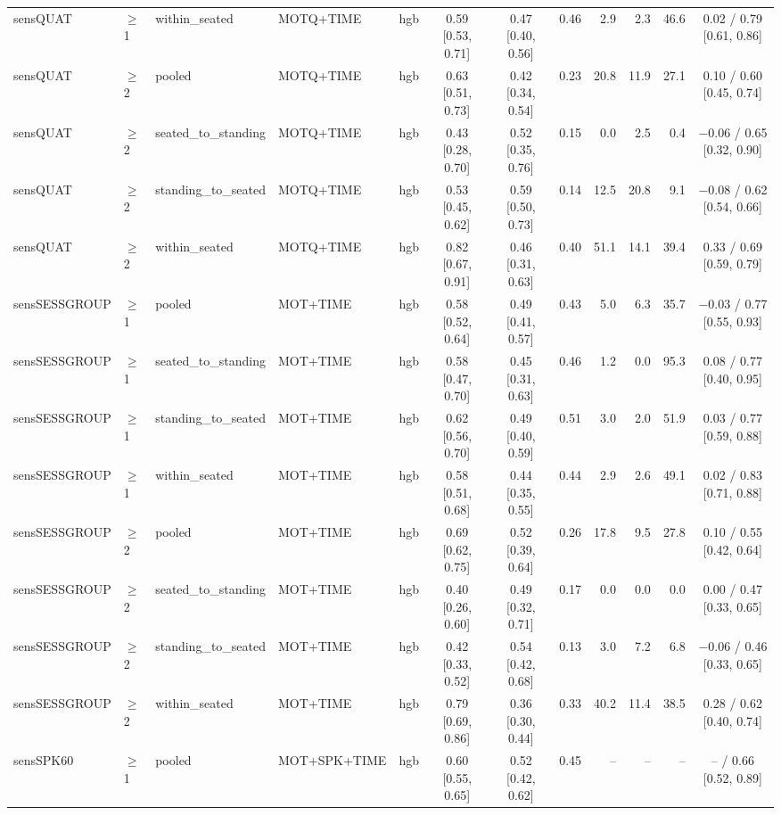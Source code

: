 \begin{longtable}{@{}lllllcccrrrc@{}}
sensQUAT & $\geq$1 & within\_seated & MOTQ+TIME & hgb & 0.59 [0.53, 0.71] & 0.47 [0.40, 0.56] & 0.46 & 2.9 & 2.3 & 46.6 & 0.02 / 0.79 [0.61, 0.86] \\
sensQUAT & $\geq$2 & pooled & MOTQ+TIME & hgb & 0.63 [0.51, 0.73] & 0.42 [0.34, 0.54] & 0.23 & 20.8 & 11.9 & 27.1 & 0.10 / 0.60 [0.45, 0.74] \\
sensQUAT & $\geq$2 & seated\_to\_standing & MOTQ+TIME & hgb & 0.43 [0.28, 0.70] & 0.52 [0.35, 0.76] & 0.15 & 0.0 & 2.5 & 0.4 & $-$0.06 / 0.65 [0.32, 0.90] \\
sensQUAT & $\geq$2 & standing\_to\_seated & MOTQ+TIME & hgb & 0.53 [0.45, 0.62] & 0.59 [0.50, 0.73] & 0.14 & 12.5 & 20.8 & 9.1 & $-$0.08 / 0.62 [0.54, 0.66] \\
sensQUAT & $\geq$2 & within\_seated & MOTQ+TIME & hgb & 0.82 [0.67, 0.91] & 0.46 [0.31, 0.63] & 0.40 & 51.1 & 14.1 & 39.4 & 0.33 / 0.69 [0.59, 0.79] \\
sensSESSGROUP & $\geq$1 & pooled & MOT+TIME & hgb & 0.58 [0.52, 0.64] & 0.49 [0.41, 0.57] & 0.43 & 5.0 & 6.3 & 35.7 & $-$0.03 / 0.77 [0.55, 0.93] \\
sensSESSGROUP & $\geq$1 & seated\_to\_standing & MOT+TIME & hgb & 0.58 [0.47, 0.70] & 0.45 [0.31, 0.63] & 0.46 & 1.2 & 0.0 & 95.3 & 0.08 / 0.77 [0.40, 0.95] \\
sensSESSGROUP & $\geq$1 & standing\_to\_seated & MOT+TIME & hgb & 0.62 [0.56, 0.70] & 0.49 [0.40, 0.59] & 0.51 & 3.0 & 2.0 & 51.9 & 0.03 / 0.77 [0.59, 0.88] \\
sensSESSGROUP & $\geq$1 & within\_seated & MOT+TIME & hgb & 0.58 [0.51, 0.68] & 0.44 [0.35, 0.55] & 0.44 & 2.9 & 2.6 & 49.1 & 0.02 / 0.83 [0.71, 0.88] \\
sensSESSGROUP & $\geq$2 & pooled & MOT+TIME & hgb & 0.69 [0.62, 0.75] & 0.52 [0.39, 0.64] & 0.26 & 17.8 & 9.5 & 27.8 & 0.10 / 0.55 [0.42, 0.64] \\
sensSESSGROUP & $\geq$2 & seated\_to\_standing & MOT+TIME & hgb & 0.40 [0.26, 0.60] & 0.49 [0.32, 0.71] & 0.17 & 0.0 & 0.0 & 0.0 & 0.00 / 0.47 [0.33, 0.65] \\
sensSESSGROUP & $\geq$2 & standing\_to\_seated & MOT+TIME & hgb & 0.42 [0.33, 0.52] & 0.54 [0.42, 0.68] & 0.13 & 3.0 & 7.2 & 6.8 & $-$0.06 / 0.46 [0.33, 0.65] \\
sensSESSGROUP & $\geq$2 & within\_seated & MOT+TIME & hgb & 0.79 [0.69, 0.86] & 0.36 [0.30, 0.44] & 0.33 & 40.2 & 11.4 & 38.5 & 0.28 / 0.62 [0.40, 0.74] \\
sensSPK60 & $\geq$1 & pooled & MOT+SPK+TIME & hgb & 0.60 [0.55, 0.65] & 0.52 [0.42, 0.62] & 0.45 & -- & -- & -- & -- / 0.66 [0.52, 0.89] \\

\end{longtable}
